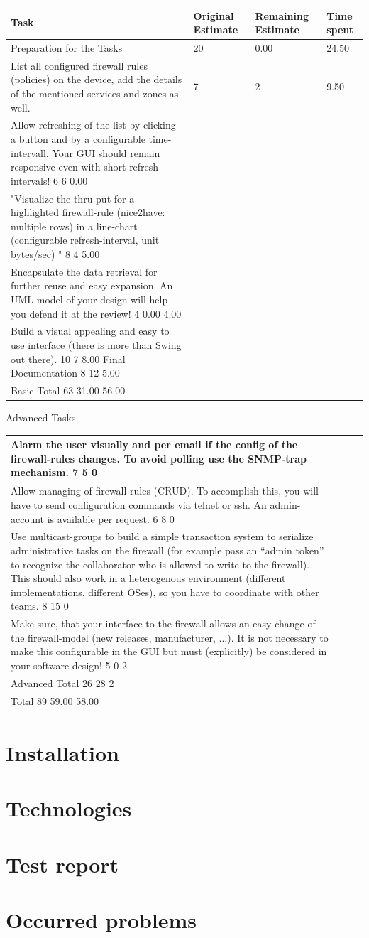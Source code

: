 \documentclass[11pt, a4paper]{article}
\begin{document}
\begin{tabular} {| l | l | l | l |}
	\hline
Task &	Original Estimate & Remaining Estimate & Time spent \\ \hline
Preparation for the Tasks &	20 &	0.00 & 24.50 \\ \hline
List all configured firewall rules (policies) on the device, add the details of the mentioned services and zones as well. &	7 &	2 &	9.50 \\ \hline
Allow refreshing of the list by clicking a button and by a configurable time-intervall. Your GUI should remain responsive even with short refresh-intervals!	6	6	0.00 \\ \hline
"Visualize the thru-put for a highlighted firewall-rule (nice2have: multiple rows) in a line-chart (configurable refresh-interval, unit bytes/sec)
"	8	4	5.00 \\ \hline
Encapsulate the data retrieval for further reuse and easy expansion. An UML-model of your design will help you defend it at the review!	4	0.00	4.00 \\ \hline
Build a visual appealing and easy to use interface (there is more than Swing out there).	10	7	8.00
Final Documentation 	8	12	5.00 \\ \hline
Basic Total	63	31.00	56.00 \\ \hline
\end{tabular}
Advanced Tasks		
\begin{tabular} {| l | l | l | l |}
Alarm the user visually and per email if the config of the firewall-rules changes. To avoid polling use the SNMP-trap mechanism.	7	5	0 \\ \hline
Allow managing of firewall-rules (CRUD). To accomplish this, you will have to send configuration commands via telnet or ssh. An admin-account is available per request.	6	8	0 \\ \hline
Use multicast-groups to build a simple transaction system to serialize administrative tasks on the firewall (for example pass an “admin token” to recognize the collaborator who is allowed to write to the firewall). This should also work in a heterogenous environment (different implementations, different OSes), so you have to coordinate with other teams.	8	15	0 \\ \hline
Make sure, that your interface to the firewall allows an easy change of the firewall-model (new releases, manufacturer, ...). It is not necessary to make this configurable in the GUI but must (explicitly) be considered in your software-design!	5	0	2 \\ \hline
Advanced Total	26	28	2 \\ \hline
Total	89	59.00	58.00
\end{tabular}

\section{Installation}

\section{Technologies}


\section{Test report}
\section{Occurred problems}
{}

\end{document}

